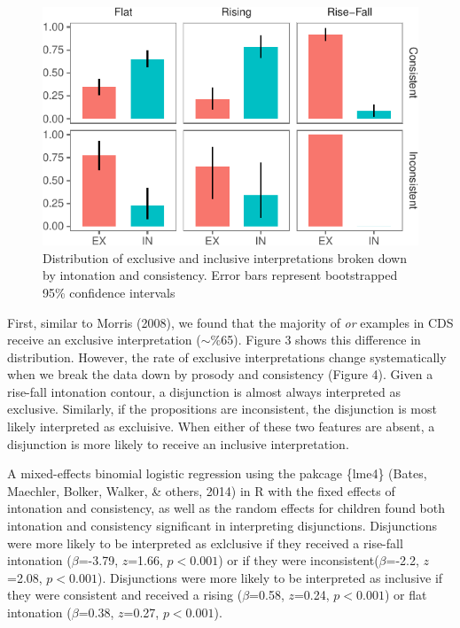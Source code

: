 \documentclass[10pt, letterpaper]{article}
\newenvironment{CodeChunk}{}{}
\begin{document}
\begin{CodeChunk}
\begin{figure}[t]

{\centering \includegraphics{figs/interpretationByIntonationAndConsistency-1} 

}

\caption[Distribution of exclusive and inclusive interpretations broken down by intonation and consistency]{Distribution of exclusive and inclusive interpretations broken down by intonation and consistency. Error bars represent bootstrapped 95\% confidence intervals}\label{fig:interpretationByIntonationAndConsistency}
\end{figure}
\end{CodeChunk}

First, similar to Morris (2008), we found that the majority of \emph{or}
examples in CDS receive an exclusive interpretation (\(\sim\)\%65).
Figure 3 shows this difference in distribution. However, the rate of
exclusive interpretations change systematically when we break the data
down by prosody and consistency (Figure 4). Given a rise-fall intonation
contour, a disjunction is almost always interpreted as exclusive.
Similarly, if the propositions are inconsistent, the disjunction is most
likely interpreted as excluisive. When either of these two features are
absent, a disjunction is more likely to receive an inclusive
interpretation.

A mixed-effects binomial logistic regression using the pakcage \{lme4\}
(Bates, Maechler, Bolker, Walker, \& others, 2014) in R with the fixed
effects of intonation and consistency, as well as the random effects for
children found both intonation and consistency significant in
interpreting disjunctions. Disjunctions were more likely to be
interpreted as exlclusive if they received a rise-fall intonation
(\(\beta\)=-3.79, \(z\)=1.66, \(p < 0.001\)) or if they were
inconsistent(\(\beta\)=-2.2, \(z\)=2.08, \(p < 0.001\)). Disjunctions
were more likely to be interpreted as inclusive if they were consistent
and received a rising (\(\beta\)=0.58, \(z\)=0.24, \(p < 0.001\)) or
flat intonation (\(\beta\)=0.38, \(z\)=0.27, \(p < 0.001\)).
\end{document}
